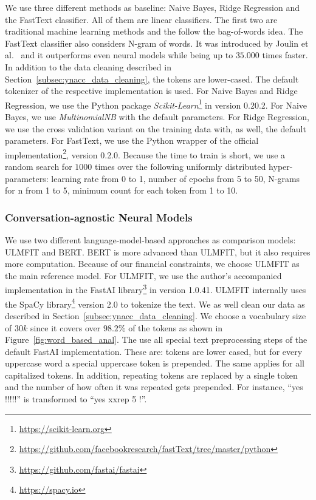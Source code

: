 We use three different methods as baseline: Naive Bayes, Ridge Regression and the FastText classifier.
All of them are linear classifiers.
The first two are traditional machine learning methods and the follow the bag-of-words idea.
The FastText classifier also considers N-gram of words.
It was introduced by Joulin et al.~\cite{E17-2068} and it outperforms even neural models while being up to $35.000$ times faster.
In addition to the data cleaning described in Section~\ref{subsec:ynacc_data_cleaning}, the tokens are lower-cased.
The default tokenizer of the respective implementation is used. For Naive Bayes and Ridge Regression, we use the Python package \textit{Scikit-Learn}\footnote{\url{https://scikit-learn.org}} in version 0.20.2. For Naive Bayes, we use \textit{MultinomialNB} with the default parameters. For Ridge Regression, we use the cross validation variant on the training data with, as well, the default parameters. For FastText, we use the Python wrapper of the official implementation\footnote{\url{https://github.com/facebookresearch/fastText/tree/master/python}}, version 0.2.0. Because the time to train is short, we use a random search for $1000$ times over the following uniformly distributed hyper-parameters: learning rate from 0 to 1, number of epochs from 5 to 50, N-grams for n from 1 to 5, minimum count for each token from 1 to 10.

\subsubsection{Conversation-agnostic Neural Models}
\label{ssssss:whaaatever}

We use two different language-model-based approaches as comparison models: ULMFIT and BERT. BERT is more advanced than ULMFIT, but it also requires more computation. Because of our financial constraints, we choose ULMFIT as the main reference model. For ULMFIT, we use the author's accompanied implementation in the FastAI library\footnote{\url{https://github.com/fastai/fastai}} in version 1.0.41. ULMFIT internally uses the SpaCy library\footnote{\url{https://spacy.io}} version 2.0 to tokenize the text. We as well clean our data as described in Section~\ref{subsec:ynacc_data_cleaning}. We choose a vocabulary size of $30k$ since it covers over $98.2\%$ of the tokens as shown in Figure~\ref{fig:word_based_anal}.
The use all special text preprocessing steps of the default FastAI implementation.
These are: tokens are lower cased, but for every uppercase word a special uppercase token is prepended. The same applies for all capitalized tokens. In addition, repeating tokens are replaced by a single token and the number of how often it was repeated gets prepended. For instance, ``yes !!!!!'' is transformed to ``yes xxrep 5 !''.

